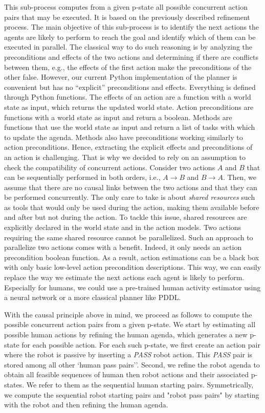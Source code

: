 This sub-process computes from a given p-state all possible concurrent action pairs that may be executed. It is based on the previously described refinement process. The main objective of this sub-process is to identify the next actions the agents are likely to perform to reach the goal and identify which of them can be executed in parallel. The classical way to do such reasoning is by analyzing the preconditions and effects of the two actions and determining if there are conflicts between them, e.g., the effects of the first action make the preconditions of the other false.
However, our current Python implementation of the planner is convenient but has no ``explicit'' preconditions and effects. Everything is defined through Python functions. The effects of an action are a function with a world state as input, which returns the updated world state. Action preconditions are functions with a world state as input and return a boolean. Methods are functions that use the world state as input and return a list of tasks with which to update the agenda. Methods also have preconditions working similarly to action preconditions. 
Hence, extracting the explicit effects and preconditions of an action is challenging. That is why we decided to rely on an assumption to check the compatibility of concurrent actions. 
Consider two actions $A$ and $B$ that can be sequentially performed in both orders, i.e., $A \rightarrow B$ and $B \rightarrow A$. Then, we assume that there are no causal links between the two actions and that they can be performed concurrently. The only care to take is about \textit{shared resources} such as tools that would only be used during the action, making them available before and after but not during the action. To tackle this issue, shared resources are explicitly declared in the world state and in the action models. Two actions requiring the same shared resource cannot be parallelized.
Such an approach to parallelize two actions comes with a benefit. Indeed, it only needs an action precondition boolean function. As a result, action estimations can be a black box with only basic low-level action precondition descriptions. This way, we can easily replace the way we estimate the next actions each agent is likely to perform. Especially for humans, we could use a pre-trained human activity estimator using a neural network or a more classical planner like PDDL. 

With the causal principle above in mind, we proceed as follows to compute the possible concurrent action pairs from a given p-state. We start by estimating all possible human actions by refining the human agenda, which generates a new p-state for each possible action. For each such p-state, we first create an action pair where the robot is passive by inserting a \textit{PASS} robot action. This \textit{PASS} pair is stored among all other `human pass pairs''. Second, we refine the robot agenda to obtain all feasible sequences of human then robot actions and their associated p-states. We refer to them as the sequential human starting pairs. Symmetrically, we compute the sequential robot starting pairs and "robot pass pairs" by starting with the robot and then refining the human agenda.

